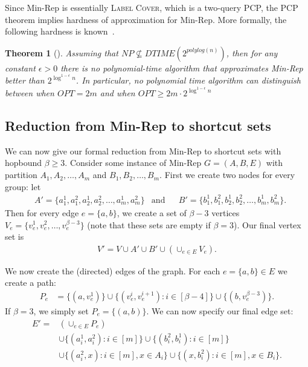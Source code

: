 \documentclass{article}
\newtheorem{theorem}{Theorem}[section]
\theoremstyle{definition}
\theoremstyle{remark}
\newcommand{\LabelCover}{\textsc{Label Cover}}
\begin{document}
Since Min-Rep is essentially \LabelCover, which is a two-query PCP, the PCP theorem implies hardness of approximation for Min-Rep.  More formally, the following hardness is known~\cite{Kor01}.

\begin{theorem}[\cite{Kor01}] \label{thm:MinRep-hardness}
    Assuming that $NP \not\subseteq DTIME(2^{polylog(n)})$, then for any constant $\epsilon > 0$ there is no polynomial-time algorithm that approximates Min-Rep better than $2^{\log^{1-\epsilon} n}$.  In particular, no polynomial time algorithm can distinguish between when $OPT = 2m$ and when $OPT \geq 2m \cdot 2^{\log^{1-\epsilon} n}$
\end{theorem}


\subsection{Reduction from Min-Rep to shortcut sets}
We can now give our formal reduction from Min-Rep to shortcut sets with hopbound $\beta \geq 3$.  Consider some instance of Min-Rep $G = (A, B, E)$ with partition $A_1, A_2, \dots, A_m$ and $B_1, B_2, \dots, B_m$.  First we create two nodes for every group: let 
\begin{align*}
&A' = \{a_1^1, a_1^2, a_2^1, a_2^2, \dots, a_m^1, a_m^2\} & \text{and} &  &B' = \{b_1^1, b_1^2, b_2^1,b_2^2, \dots, b_m^1, b_m^2\}.
\end{align*}
Then for every edge $e = \{a, b\}$, we create a set of $\beta - 3$ vertices $V_e = \{v_e^1, v_e^2, \dots, v_e^{\beta-3}\}$ (note that these sets are empty if $\beta=3$).  Our final vertex set is 
\begin{align*}
    V' = V \cup A' \cup B' \cup (\cup_{e \in E} V_e).
\end{align*}

We now create the (directed) edges of the graph.  For each $e = \{a,b\} \in E$ we create a path:
\begin{align*}
    P_e &= \{(a, v_e^1)\} \cup \{(v_e^i, v_e^{i+1}) : i \in [\beta-4]\} \cup \{(b, v_e^{\beta-3})\}.
\end{align*}
If $\beta = 3$, we simply set $P_e = \{(a,b)\}$.  We can now specify our final edge set:
\begin{align*}
    E' = &\left(\cup_{e \in E} P_e\right) \\
    &\cup \{(a_i^1, a_i^2) : i \in [m]\} \cup \{(b_i^2, b_i^1) : i \in [m]\} \\
    &\cup \{(a_i^2, x) : i \in [m], x \in A_i\} \cup \{(x, b_i^2) : i \in [m], x \in B_i\}.
\end{align*}
\end{document}
